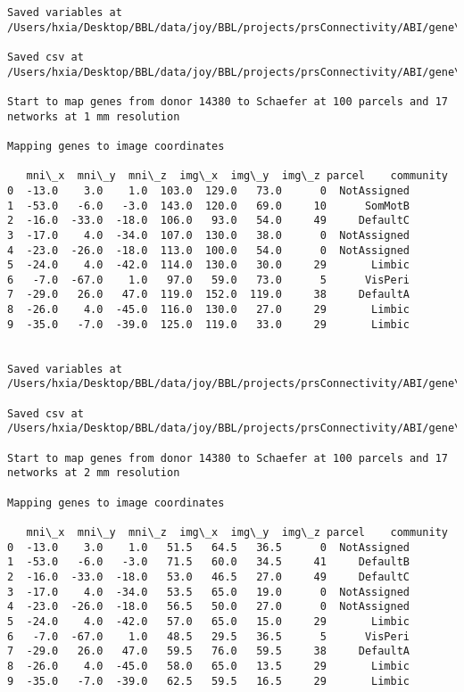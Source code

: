 \documentclass[11pt]{article}
\begin{document}
\begin{Verbatim}[commandchars=\\\{\}]
Saved variables at /Users/hxia/Desktop/BBL/data/joy/BBL/projects/prsConnectivity/ABI/gene\_mapping/14380donor\_100Parcels\_7Network\_2mm.pkl

Saved csv at /Users/hxia/Desktop/BBL/data/joy/BBL/projects/prsConnectivity/ABI/gene\_mapping/14380donor\_100Parcels\_7Network\_2mm.csv

Start to map genes from donor 14380 to Schaefer at 100 parcels and 17 networks at 1 mm resolution

Mapping genes to image coordinates

   mni\_x  mni\_y  mni\_z  img\_x  img\_y  img\_z parcel    community
0  -13.0    3.0    1.0  103.0  129.0   73.0      0  NotAssigned
1  -53.0   -6.0   -3.0  143.0  120.0   69.0     10      SomMotB
2  -16.0  -33.0  -18.0  106.0   93.0   54.0     49     DefaultC
3  -17.0    4.0  -34.0  107.0  130.0   38.0      0  NotAssigned
4  -23.0  -26.0  -18.0  113.0  100.0   54.0      0  NotAssigned
5  -24.0    4.0  -42.0  114.0  130.0   30.0     29       Limbic
6   -7.0  -67.0    1.0   97.0   59.0   73.0      5      VisPeri
7  -29.0   26.0   47.0  119.0  152.0  119.0     38     DefaultA
8  -26.0    4.0  -45.0  116.0  130.0   27.0     29       Limbic
9  -35.0   -7.0  -39.0  125.0  119.0   33.0     29       Limbic


Saved variables at /Users/hxia/Desktop/BBL/data/joy/BBL/projects/prsConnectivity/ABI/gene\_mapping/14380donor\_100Parcels\_17Network\_1mm.pkl

Saved csv at /Users/hxia/Desktop/BBL/data/joy/BBL/projects/prsConnectivity/ABI/gene\_mapping/14380donor\_100Parcels\_17Network\_1mm.csv

Start to map genes from donor 14380 to Schaefer at 100 parcels and 17 networks at 2 mm resolution

Mapping genes to image coordinates

   mni\_x  mni\_y  mni\_z  img\_x  img\_y  img\_z parcel    community
0  -13.0    3.0    1.0   51.5   64.5   36.5      0  NotAssigned
1  -53.0   -6.0   -3.0   71.5   60.0   34.5     41     DefaultB
2  -16.0  -33.0  -18.0   53.0   46.5   27.0     49     DefaultC
3  -17.0    4.0  -34.0   53.5   65.0   19.0      0  NotAssigned
4  -23.0  -26.0  -18.0   56.5   50.0   27.0      0  NotAssigned
5  -24.0    4.0  -42.0   57.0   65.0   15.0     29       Limbic
6   -7.0  -67.0    1.0   48.5   29.5   36.5      5      VisPeri
7  -29.0   26.0   47.0   59.5   76.0   59.5     38     DefaultA
8  -26.0    4.0  -45.0   58.0   65.0   13.5     29       Limbic
9  -35.0   -7.0  -39.0   62.5   59.5   16.5     29       Limbic



\end{Verbatim}
\end{document}
